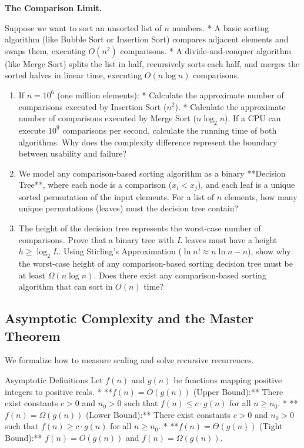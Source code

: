 \documentclass[12pt, a4paper]{book}
\begin{document}
\begin{puzzlebox}
\textbf{The Comparison Limit.}

Suppose we want to sort an unsorted list of $n$ numbers.
* A basic sorting algorithm (like Bubble Sort or Insertion Sort) compares adjacent elements and swaps them, executing $O(n^2)$ comparisons.
* A divide-and-conquer algorithm (like Merge Sort) splits the list in half, recursively sorts each half, and merges the sorted halves in linear time, executing $O(n \log n)$ comparisons.
\begin{enumerate}[label=(\alph*), leftmargin=*]
  \item If $n = 10^6$ (one million elements):
        * Calculate the approximate number of comparisons executed by Insertion Sort ($n^2$).
        * Calculate the approximate number of comparisons executed by Merge Sort ($n \log_2 n$).
        If a CPU can execute $10^9$ comparisons per second, calculate the running time of both algorithms. Why does the complexity difference represent the boundary between usability and failure?
  \item We model any comparison-based sorting algorithm as a binary **Decision Tree**, where each node is a comparison ($x_i < x_j$), and each leaf is a unique sorted permutation of the input elements.
        For a list of $n$ elements, how many unique permutations (leaves) must the decision tree contain?
  \item The height of the decision tree represents the worst-case number of comparisons.
        Prove that a binary tree with $L$ leaves must have a height $h \ge \log_2 L$.
        Using Stirling's Approximation ($\ln n! \approx n \ln n - n$), show why the worst-case height of any comparison-based sorting decision tree must be at least $\Omega(n \log n)$.
        Does there exist any comparison-based sorting algorithm that can sort in $O(n)$ time?
\end{enumerate}
\end{puzzlebox}

\subsection{Asymptotic Complexity and the Master Theorem}

We formalize how to measure scaling and solve recursive recurrences.

\begin{namedconcept}{Asymptotic Definitions}
Let $f(n)$ and $g(n)$ be functions mapping positive integers to positive reals.
* **$f(n) = O(g(n))$ (Upper Bound):** There exist constants $c > 0$ and $n_0 > 0$ such that $f(n) \le c \cdot g(n)$ for all $n \ge n_0$.
* **$f(n) = \Omega(g(n))$ (Lower Bound):** There exist constants $c > 0$ and $n_0 > 0$ such that $f(n) \ge c \cdot g(n)$ for all $n \ge n_0$.
* **$f(n) = \Theta(g(n))$ (Tight Bound):** $f(n) = O(g(n))$ and $f(n) = \Omega(g(n))$.
\end{namedconcept}
\end{document}
